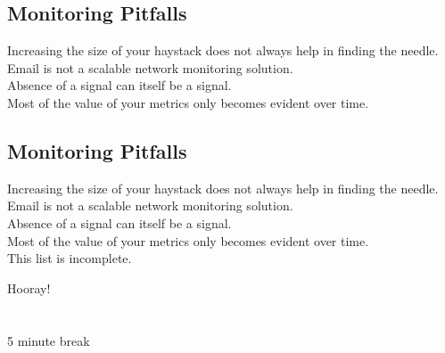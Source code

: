 \documentclass[xga]{xdvislides}
\begin{document}
\subsection{Monitoring Pitfalls}
\vspace*{\fill}
\Huge
\begin{center}
Increasing the size of your haystack does not always
help in finding the needle. \\
\vspace{.2in}
Email is not a scalable network monitoring solution. \\
\vspace{.2in}
Absence of a signal can itself be a signal. \\
\vspace{.2in}
Most of the value of your metrics only becomes evident
over time.
\end{center}
\Normalsize
\vspace*{\fill}

\subsection{Monitoring Pitfalls}
\vspace*{\fill}
\Huge
\begin{center}
Increasing the size of your haystack does not always
help in finding the needle. \\
\vspace{.2in}
Email is not a scalable network monitoring solution. \\
\vspace{.2in}
Absence of a signal can itself be a signal. \\
\vspace{.2in}
Most of the value of your metrics only becomes evident
over time. \\
\vspace{.2in}
This list is incomplete.
\end{center}
\Normalsize
\vspace*{\fill}

\newpage
\vspace*{\fill}
\begin{center}
	\Hugesize
		Hooray!\\ [1em]
	\hspace*{5mm}
	\blueline\\
	\hspace*{5mm}\\
		5 minute break
\end{center}
\vspace*{\fill}
\end{document}
